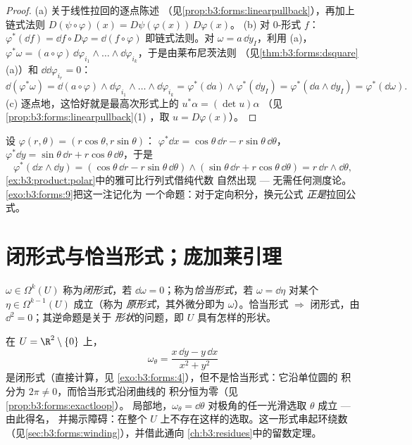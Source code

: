 \begin{proof}
(a) 关于线性拉回的逐点陈述
（见\cref{prop:b3:forms:linearpullback}），再加上链式法则
$D(\psi\circ\varphi)(x) = D\psi(\varphi(x))\,D\varphi(x)$。
(b) 对 $0$-形式 $f$：$\varphi^*(\dd f) = \dd f \circ
D\varphi = \dd(f \circ \varphi)$ 即链式法则。对
$\omega = a\,\dd y_I$，利用 (a)，$\varphi^*\omega =
(a\circ\varphi)\,\dd\varphi_{i_1}\wedge\dots\wedge
\dd\varphi_{i_k}$，于是由莱布尼茨法则
（见\cref{thm:b3:forms:dsquare}(a)）和 $\dd\dd\varphi_{i_r} =
0$：
\[
\dd(\varphi^*\omega) = \dd(a\circ\varphi) \wedge
\dd\varphi_{i_1}\wedge\dots\wedge\dd\varphi_{i_k}
= \varphi^*(\dd a) \wedge \varphi^*(\dd y_I)
= \varphi^*(\dd a \wedge \dd y_I) =
\varphi^*(\dd\omega).
\]
(c) 逐点地，这恰好就是最高次形式上的 $u^*\alpha = (\det u)\alpha$
（见\cref{prop:b3:forms:linearpullback}(1)
，取 $u = D\varphi(x)$）。
\end{proof}

\begin{example}[极坐标]\label{ex:b3:forms:polar}
设 $\varphi(r, \theta) = (r\cos\theta, r\sin\theta)$：
$\varphi^*\dd x = \cos\theta\,\dd r -
r\sin\theta\,\dd\theta$，$\varphi^*\dd y = \sin\theta\,\dd r
+ r\cos\theta\,\dd\theta$，于是
\[
\varphi^*(\dd x \wedge \dd y) =
(\cos\theta\,\dd r - r\sin\theta\,\dd\theta) \wedge
(\sin\theta\,\dd r + r\cos\theta\,\dd\theta)
= r\,\dd r \wedge \dd\theta,
\]
\cref{ex:b3:product:polar}中的雅可比行列式借纯代数
自然出现 --- 无需任何测度论。\cref{exo:b3:forms:9}把这一注记化为
一个命题：对于定向积分，换元公式
\emph{正是}拉回公式。
\end{example}

\section{闭形式与恰当形式；庞加莱引理}

\begin{definition}\label{def:b3:forms:closedexact}
$\omega \in \Omega^k(U)$ 称为\emph{闭形式}，若
$\dd\omega = 0$；称为\emph{恰当形式}，若
$\omega = \dd\eta$ 对某个 $\eta \in \Omega^{k-1}(U)$ 成立（称为
\emph{原形式}，其外微分即为 $\omega$）。恰当形式 $\Rightarrow$ 闭形式，由
$\dd^2 = 0$；其逆命题是关于
\emph{形状}的问题，即 $U$ 具有怎样的形状。
\end{definition}

\begin{example}[角形式]\label{ex:b3:forms:angular}
在 $U = \R^2 \setminus \{0\}$ 上，
\[
\omega_\theta = \frac{x\,\dd y - y\,\dd x}{x^2 + y^2}
\]
是闭形式（直接计算，见
\cref{exo:b3:forms:4}），但不是恰当形式：它沿单位圆的
积分为 $2\pi \neq 0$，而恰当形式沿闭曲线的
积分恒为零（见\cref{prop:b3:forms:exactloop}）。
局部地，$\omega_\theta = \dd\theta$ 对极角的任一光滑选取
$\theta$ 成立 --- 由此得名，
并揭示障碍：在整个
$U$ 上不存在这样的选取。这一形式串起环绕数
（见\cref{sec:b3:forms:winding}），并借此通向
\cref{ch:b3:residues}中的留数定理。
\end{example}

